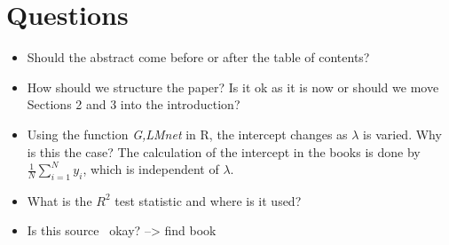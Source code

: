 \section*{Questions}
\begin{itemize}
    \item Should the abstract come before or after the table of contents?
    \item How should we structure the paper? Is it ok as it is now or should we move Sections 2 and 3 into the introduction?
    \item Using the function \textit{G,LMnet} in R, the intercept changes as $\lambda$ is varied. Why is this the case? The calculation of the intercept in the books is done by $\frac{1}{N}\sum_{i=1}^N y_i$, which is independent of $\lambda$.
    \item What is the $R^2$ test statistic and where is it used?
    \item Is this source~\cite{Kj2018} okay? --> find book
\end{itemize}
